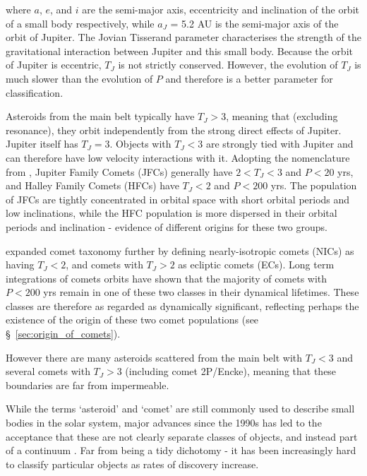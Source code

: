 where $a$, $e$, and $i$ are the semi-major axis, eccentricity and inclination of the orbit of a small body respectively, while $a_J$ = 5.2 AU is the semi-major axis of the orbit of Jupiter. The Jovian Tisserand parameter characterises the strength of the
gravitational interaction between Jupiter and this small body. Because the orbit of Jupiter is eccentric, $T_J$ is not strictly conserved. However, the evolution of $T_J$ is much slower than the evolution of $P$ and therefore is a better parameter for classification. 

Asteroids from the main belt typically have $T_J > 3$, meaning that (excluding resonance), they orbit independently from the strong direct effects of Jupiter. Jupiter itself has  $T_J = 3$. Objects with  $T_J < 3$ are strongly tied with Jupiter and can therefore have low velocity interactions with it. Adopting the nomenclature from \cite{1987PAICz..67...21C}, Jupiter Family Comets (JFCs) generally have $2 < T_J < 3$ and $P < 20$ yrs, and Halley Family Comets (HFCs) have $T_J < 2$ and $P < 200$ yrs. The population of JFCs are tightly concentrated in orbital space with short orbital periods and low inclinations, while the HFC population is more dispersed in their orbital periods and inclination - evidence of different origins for these two groups.

\cite{1996ASPC..107..173L} expanded comet taxonomy further by defining nearly-isotropic comets (NICs) as having $T_J < 2$, and comets with  $T_J > 2$ as ecliptic comets (ECs). Long term integrations of comets orbits have shown that the majority of comets with $P < 200$ yrs remain in one of these two classes in their dynamical lifetimes. These classes are therefore as regarded as dynamically significant, reflecting perhaps the existence of the origin of these two comet populations (see \S~\ref{sec:origin_of_comets}).

However there are many asteroids scattered from the main belt with  $T_J < 3$ and several comets with  $T_J > 3$ (including comet 2P/Encke), meaning that these boundaries are far from impermeable.

While the terms `asteroid' and `comet' are still commonly used to describe small bodies in the solar system, major advances since the 1990s has led to the acceptance that these are not clearly separate classes of objects, and instead part of a continuum \cite{1989aste.conf..880W, 2002aste.book..669W}. Far from being a tidy dichotomy - it has been increasingly hard to classify particular objects as rates of discovery increase.

